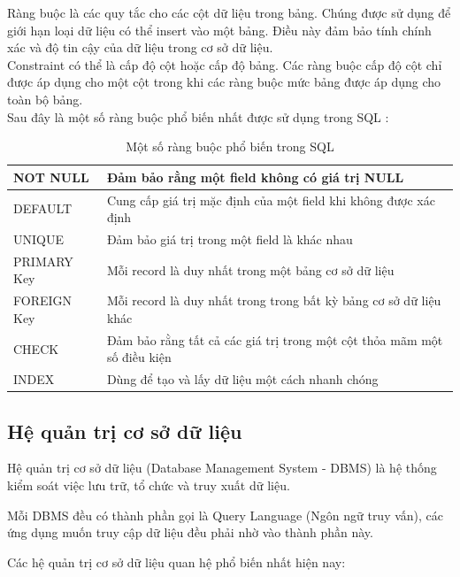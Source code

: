 Ràng buộc là các quy tắc cho các cột dữ liệu trong bảng. Chúng được sử dụng để giới hạn loại dữ liệu có thể insert vào một bảng. Điều này đảm bảo tính chính xác và độ tin cậy của dữ liệu trong cơ sở dữ liệu.\\
Constraint có thể là cấp độ cột hoặc cấp độ bảng. Các ràng buộc cấp độ cột chỉ được áp dụng cho một
cột trong khi các ràng buộc mức bảng được áp dụng cho toàn bộ bảng.\\
Sau đây là một số ràng buộc phổ biến nhất được sử dụng trong SQL :\\
\begin{table}[H]
    \centering
    \begin{tabular}{|l|l|}
        \hline
         NOT NULL&Đảm bảo rằng một field không có giá trị NULL  \\
         \hline
         DEFAULT&Cung cấp giá trị mặc định của một field khi không được xác định\\
         \hline
         UNIQUE&Đảm bảo giá trị trong một field là khác nhau\\
         \hline
         PRIMARY Key&Mỗi record là duy nhất trong một bảng cơ sở dữ liệu\\
         \hline
         FOREIGN Key&Mỗi record là duy nhất trong trong bất kỳ bảng cơ sở dữ liệu khác\\
         \hline
         CHECK&Đảm bảo rằng tất cả các giá trị trong một cột thỏa mãm một số điều kiện\\
         \hline
         INDEX&Dùng để tạo và lấy dữ liệu một cách nhanh chóng\\
         \hline
    \end{tabular}
    \caption{Một số ràng buộc phổ biến trong SQL}
\end{table}
\subsection{Hệ quản trị cơ sở dữ liệu}

Hệ quản trị cơ sở dữ liệu (Database Management System - DBMS) là hệ thống kiểm soát việc lưu trữ, tổ chức và truy xuất dữ liệu.

Mỗi DBMS đều có thành phần gọi là Query Language (Ngôn ngữ truy vấn), các ứng dụng muốn truy cập dữ liệu đều phải nhờ vào thành phần này.

Các hệ quản trị cơ sở dữ liệu quan hệ phổ biến nhất hiện nay:
